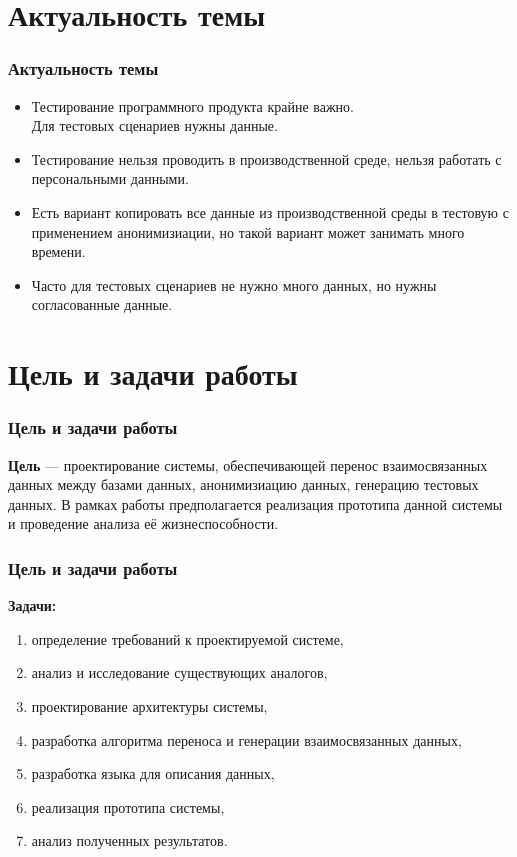 \documentclass[pdf, hyperref={unicode}, aspectratio=169]{beamer}
\begin{document}

{
	\frame{\titlepage}
}

\section{Актуальность темы}
\begin{frame}
	\frametitle{Актуальность темы}
	\begin{itemize}
		\item Тестирование программного продукта крайне важно. \\ Для тестовых сценариев нужны данные.
		\item Тестирование нельзя проводить в производственной среде, нельзя работать с персональными данными.
		\item Есть вариант копировать все данные из производственной среды в тестовую с применением анонимизиации, но такой вариант может занимать много времени.
		\item Часто для тестовых сценариев не нужно много данных, но нужны согласованные данные.
	\end{itemize}
\end{frame}


\section{Цель и задачи работы}
\begin{frame}
	\frametitle{Цель и задачи работы}
	
	\textbf{Цель} --- проектирование системы, обеспечивающей перенос взаимосвязанных данных между базами данных, анонимизиацию данных, генерацию тестовых данных. В рамках работы предполагается реализация прототипа данной системы и проведение анализа её жизнеспособности.
\end{frame}


\begin{frame}
	\frametitle{Цель и задачи работы}
	
	\textbf{Задачи:}
	\begin{enumerate}
		\item определение требований к проектируемой системе,
		\item анализ и исследование существующих аналогов,
		\item проектирование архитектуры системы,
		\item разработка алгоритма переноса и генерации взаимосвязанных данных,
		\item разработка языка для описания данных,
		\item реализация прототипа системы,
		\item анализ полученных результатов.
	\end{enumerate}
\end{frame}
\end{document}
